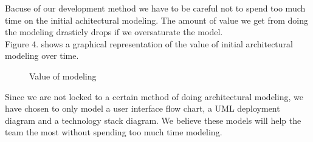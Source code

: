 Bacuse of our development method we have to be careful not to spend too much time on the initial achitectural modeling. The amount of value we get from doing the modeling drasticly drops if we oversaturate the model.\\
Figure 4. shows a graphical representation of the value of initial architectural modeling over time.
\begin{figure}[H]
\caption{Value of modeling \cite{valueofmodeling}}
\end{figure}

Since we are not locked to a certain method of doing architectural modeling, we have chosen to only model a user interface flow chart, a UML deployment diagram and a technology stack diagram. We believe these models will help the team the most without spending too much time modeling.

